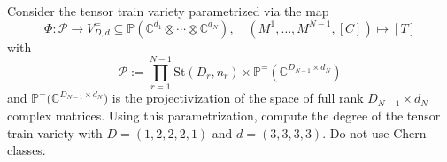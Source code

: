 Consider the tensor train variety parametrized via the map
$$
\Phi:\mathcal P\longrightarrow
V^{=}_{D,d} \subseteq\mathbb{P}\!\left(
\mathbb{C}^{d_1}\otimes\cdots\otimes \mathbb{C}^{d_N}
\right), \quad
(M^1,\dots,M^{N-1},[C])\longmapsto [T]
$$
with
$$
\mathcal P
:=
\prod_{r=1}^{N-1}\mathrm{St}(D_r,n_r)
\times
\mathbb{P}^=\!\left(\mathbb{C}^{D_{N-1}\times d_N}\right)
$$
and $\mathbb{P}^{=}\!\bigl(\mathbb{C}^{D_{N-1}\times d_N}\bigr)$ is the projectivization of the space of full rank $D_{N-1}\times d_N$ complex matrices. Using this parametrization, compute the degree of the tensor train variety with $D = (1, 2, 2, 2, 1)$ and $d = (3, 3, 3, 3)$. Do not use Chern classes.
